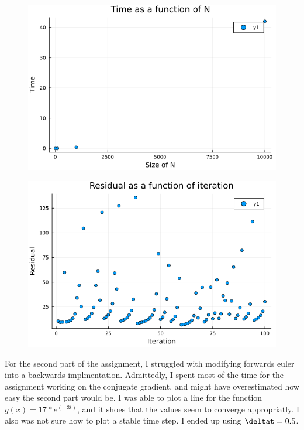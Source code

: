 \documentclass[a4paper,10pt,BCOR10mm,oneside,headsepline]{scrartcl}
\begin{document}
\begin{figure}[h]
\centering
\includegraphics[scale=0.75]{testPlot.png}
\end{figure}

\begin{figure}[h]
\centering
\includegraphics[scale=0.75]{testPlotNew.png}
\end{figure}

\newpage

For the second part of the assignment, I struggled with modifying forwards euler into a backwards implmentation. Admittedly, I spent most of the
time for the assignment working on the conjugate gradient, and might have overestimated how easy the second part would be.
I was able to plot a line for the function $g(x) = 17*e^(-3t)$, and it shoes that the values seem to converge appropriatly. I also was not sure
how to plot a stable time step. I ended up using $\deltat = 0.5$.
\end{document}
